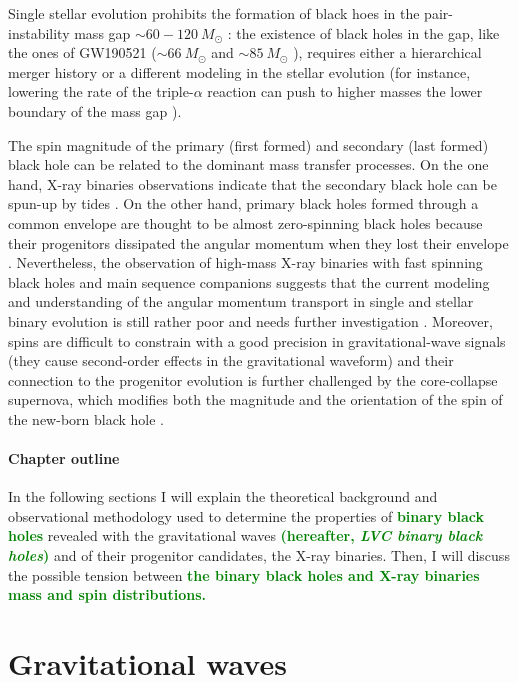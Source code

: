 \documentclass[a4paper,titlepage]{book}     	%
\newcommand{\sun}{\ensuremath{_\odot}}
\newcommand{\msun}{\ensuremath{M\sun}}
\newcommand{\erika}[1]{\textcolor{green}{\bf#1}}
\begin{document}
Single stellar evolution prohibits the formation of black hoes in the pair-instability mass gap $\sim 60 - 120 ~\msun$ \cite{spera2017_pisnSNe}: the existence of black holes in the gap, like the ones of GW190521 ($\sim 66~\msun$ and $\sim 85~\msun$ \cite{GW190521_abbott2020}), requires either a hierarchical merger history or a different modeling in the stellar evolution (for instance, lowering the rate of the triple-$\alpha$ reaction can push to higher masses the lower boundary of the mass gap \cite{MassGapStellarEvo_Costa2021}).

The spin magnitude of the primary (first formed) and secondary (last formed) black hole can be related to the dominant mass transfer processes. On the one hand, X-ray binaries observations indicate that the secondary black hole can be spun-up by tides \cite{spinupBH_Bavera2020}. On the other hand, primary black holes formed through a common envelope are thought to be almost zero-spinning black holes because their progenitors dissipated the angular momentum when they lost their envelope \cite{spinBH_Qin2018}.  Nevertheless, the observation of high-mass X-ray binaries with fast spinning black holes and main sequence companions suggests that the current modeling and understanding of the angular momentum transport in single and stellar binary evolution is still rather poor and needs further investigation \cite{spinfastBH_Qin2019}. Moreover, spins are difficult to constrain with a good precision in gravitational-wave signals (they cause second-order effects in the gravitational waveform) and their connection to the progenitor evolution is further challenged by the core-collapse supernova, which modifies both the magnitude and the orientation of the spin of the new-born black hole \cite{GWTC-3_interpretation}.

\paragraph{Chapter outline}
In the following sections I will explain the theoretical background and observational methodology used to determine the properties of \erika{binary black holes}  revealed with the gravitational waves \erika{(hereafter, \emph{LVC binary black holes})} and of their progenitor candidates, the X-ray binaries. Then, I will discuss the possible tension between \erika{the binary black holes and X-ray binaries mass and spin distributions.} %


\section{Gravitational waves}
\end{document}
